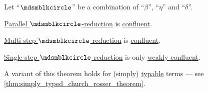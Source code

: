 \begin{theorem}\label{thm:church_rosser_theorem}
  Let \enquote{\( {\Anon} \)} be a combination of \enquote{\( \beta \)}, \enquote{\( \eta \)} and \enquote{\( \delta \)}.

  \begin{thmenum}
     \hyperref[def:parallel_reduction]{Parallel \( \Anon \)-reduction} is \hyperref[def:reduction_confluence]{confluent}.

     \hyperref[def:lambda_term_reduction/multi]{Multi-step \( \Anon \)-reduction} is \hyperref[def:reduction_confluence]{confluent}.

     \hyperref[def:lambda_term_reduction/single]{Single-step \( \Anon \)-reduction} is only \hyperref[def:reduction_confluence]{weakly confluent}.
  \end{thmenum}
\end{theorem}
\begin{comments}
  \item A variant of this theorem holds for (simply) \hyperref[def:typability]{typable} terms --- see \cref{thm:simply_typed_church_rosser_theorem}.
\end{comments}
